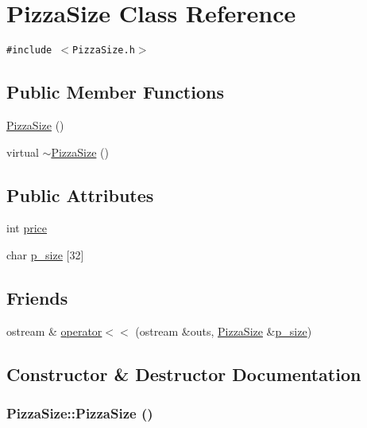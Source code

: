 \hypertarget{class_pizza_size}{
\section{Pizza\-Size Class Reference}
\label{class_pizza_size}
}
{\tt \#include $<$Pizza\-Size.h$>$}

\subsection*{Public Member Functions}
\begin{CompactItemize}
\item 
\hyperlink{class_pizza_size_62ec78b338c07d4c98932bc7b71d2320}{Pizza\-Size} ()
\item 
virtual \hyperlink{class_pizza_size_1e38361f1aaa91379e38ba18d5c7d579}{$\sim$Pizza\-Size} ()
\end{CompactItemize}
\subsection*{Public Attributes}
\begin{CompactItemize}
\item 
int \hyperlink{class_pizza_size_78a5eb43deef9a7b5b9ce157b9d52ac4}{price}
\item 
char \hyperlink{class_pizza_size_42c17e691e40072f9ef449e812c5ecc3}{p\_\-size} \mbox{[}32\mbox{]}
\end{CompactItemize}
\subsection*{Friends}
\begin{CompactItemize}
\item 
ostream \& \hyperlink{class_pizza_size_aeefabdbf1b3e9ffbc20170fcdee8bec}{operator$<$$<$} (ostream \&outs, \hyperlink{class_pizza_size}{Pizza\-Size} \&\hyperlink{class_pizza_size_42c17e691e40072f9ef449e812c5ecc3}{p\_\-size})
\end{CompactItemize}


\subsection{Constructor \& Destructor Documentation}
\hypertarget{class_pizza_size_62ec78b338c07d4c98932bc7b71d2320}{
\subsubsection[PizzaSize]{\setlength{\rightskip}{0pt plus 5cm}Pizza\-Size::Pizza\-Size ()}}
\label{class_pizza_size_62ec78b338c07d4c98932bc7b71d2320}


